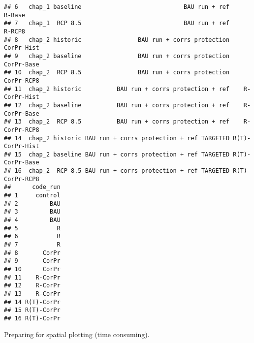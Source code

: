 \documentclass[
]{article}
\newenvironment{Shaded}{\begin{snugshade}}{\end{snugshade}}
\newcommand{\CommentTok}[1]{\textcolor[rgb]{0.56,0.35,0.01}{\textit{#1}}}
\begin{document}
\begin{verbatim}
## 6   chap_1 baseline                             BAU run + ref          R-Base
## 7   chap_1  RCP 8.5                             BAU run + ref          R-RCP8
## 8   chap_2 historic                BAU run + corrs protection      CorPr-Hist
## 9   chap_2 baseline                BAU run + corrs protection      CorPr-Base
## 10  chap_2  RCP 8.5                BAU run + corrs protection      CorPr-RCP8
## 11  chap_2 historic          BAU run + corrs protection + ref    R-CorPr-Hist
## 12  chap_2 baseline          BAU run + corrs protection + ref    R-CorPr-Base
## 13  chap_2  RCP 8.5          BAU run + corrs protection + ref    R-CorPr-RCP8
## 14  chap_2 historic BAU run + corrs protection + ref TARGETED R(T)-CorPr-Hist
## 15  chap_2 baseline BAU run + corrs protection + ref TARGETED R(T)-CorPr-Base
## 16  chap_2  RCP 8.5 BAU run + corrs protection + ref TARGETED R(T)-CorPr-RCP8
##      code_run
## 1     control
## 2         BAU
## 3         BAU
## 4         BAU
## 5           R
## 6           R
## 7           R
## 8       CorPr
## 9       CorPr
## 10      CorPr
## 11    R-CorPr
## 12    R-CorPr
## 13    R-CorPr
## 14 R(T)-CorPr
## 15 R(T)-CorPr
## 16 R(T)-CorPr
\end{verbatim}

Preparing for spatial plotting (time consuming).

\begin{Shaded}
\end{Shaded}
\end{document}
